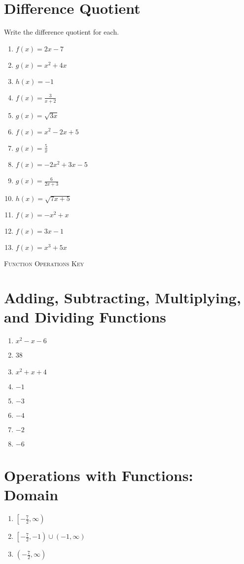 \section{Difference Quotient}

Write the difference quotient for each.
\begin{enumerate}
	\item $f(x) = 2x - 7$
	\item $g(x) = x^2 + 4x$
	\item $h(x) = -1$
	\item $f(x) = \frac{3}{x+2}$
	\item $g(x) = \sqrt{3x}$
	\item $f(x) = x^2 - 2x + 5$
	\item $g(x) = \frac{5}{x}$
	\item $f(x) = -2x^2 + 3x - 5$
	\item $g(x) = \frac{6}{2x+3}$
	\item $h(x) = \sqrt{7x+5}$
	\item $f(x) = -x^2 + x$
	\item $f(x) = 3x - 1$
	\item $f(x) = x^3 + 5x$
\end{enumerate}


\newpage


\textsc{Function Operations Key}

\section*{Adding, Subtracting, Multiplying, and Dividing Functions}

\begin{enumerate}
    \item $x^2-x-6$
    \item 38
    \item $x^2+x+4$
    \item $-1$
     \item $-3$
     \item $-4$
     \item $-2$
     \item $-6$
\end{enumerate}

\section*{Operations with Functions: Domain}
\begin{enumerate}
	\item $\left[-\frac{7}{2}, \infty\right)$
    \item $\left[-\frac{7}{2}, -1\right) \cup (-1, \infty)$
    \item $\left(-\frac{7}{2}, \infty\right)$
\end{enumerate}

